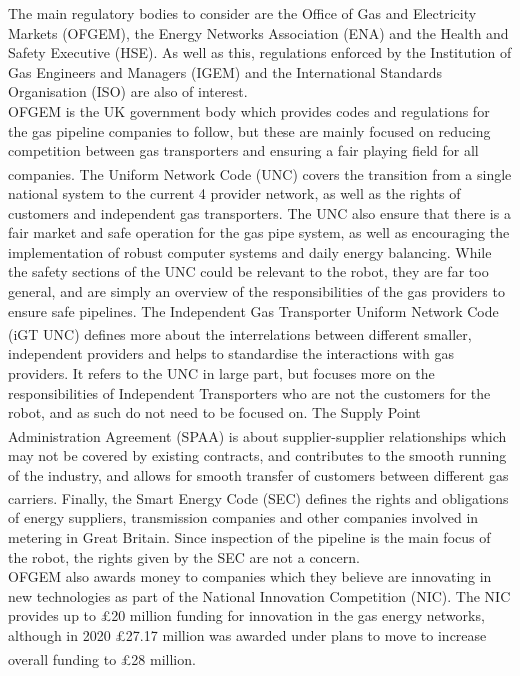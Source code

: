 \documentclass[11pt]{article}		%
\newcommand{\supercite}[1]{\textsuperscript{\cite{#1}}}		%
\begin{document}
			The main regulatory bodies to consider are the Office of Gas and Electricity Markets (OFGEM), the Energy Networks Association (ENA) and the Health and Safety Executive (HSE).
			As well as this, regulations enforced by the Institution of Gas Engineers and Managers (IGEM) and the International Standards Organisation (ISO) are also of interest.
 			\\
			OFGEM is the UK government body which provides codes and regulations for the gas pipeline companies to follow, but these are mainly focused on reducing competition between gas transporters and ensuring a fair playing field for all companies.
			The Uniform Network Code (UNC)\supercite{joint2005uniform} covers the transition from a single national system to the current 4 provider network, as well as the rights of customers and independent gas transporters.
			The UNC also ensure that there is a fair market and safe operation for the gas pipe system, as well as encouraging the implementation of robust computer systems and daily energy balancing.
			While the safety sections of the UNC could be relevant to the robot, they are far too general, and are simply an overview of the responsibilities of the gas providers to ensure safe pipelines.
			The Independent Gas Transporter Uniform Network Code (iGT UNC)\supercite{igt2021independent} defines more about the interrelations between different smaller, independent providers and helps to standardise the interactions with gas providers.
			It refers to the UNC in large part, but focuses more on the responsibilities of Independent Transporters who are not the customers for the robot, and as such do not need to be focused on.
			The Supply Point Administration Agreement (SPAA)\supercite{spaa2021supply} is about supplier-supplier relationships which may not be covered by existing contracts, and contributes to the smooth running of the industry, and allows for smooth transfer of customers between different gas carriers.
			Finally, the Smart Energy Code (SEC)\supercite{smart2021smart} defines the rights and obligations of energy suppliers, transmission companies and other companies involved in metering in Great Britain.
			Since inspection of the pipeline is the main focus of the robot, the rights given by the SEC are not a concern.
			\\
			OFGEM also awards money to companies which they believe are innovating in new technologies as part of the National Innovation Competition (NIC).
			The NIC provides up to £20 million funding for innovation in the gas energy networks, although in 2020 £27.17 million was awarded under plans to move to increase overall funding to £28 million\supercite{ofgem2020nic}.
\end{document}
